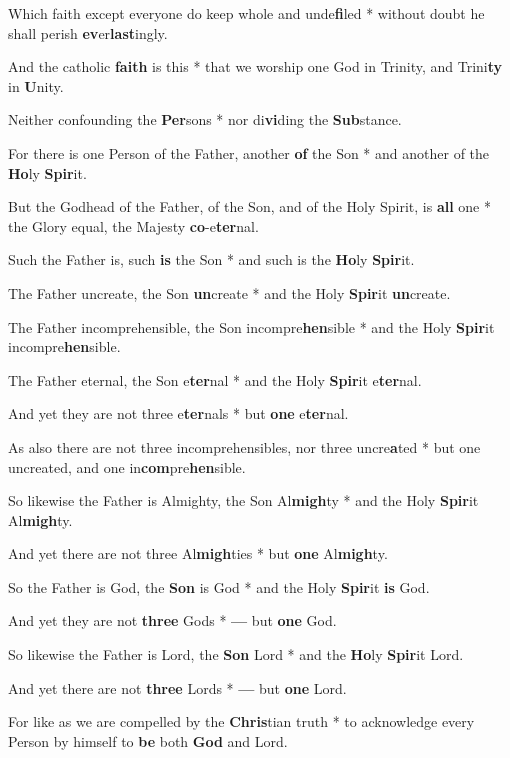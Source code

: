 \begin{multicols}{2}
	Which faith except everyone do keep whole and unde\textbf{fi}led * without doubt he shall perish \textbf{ev}er\textbf{last}ingly.
	
	And the catholic \textbf{faith} is this * that we worship one God in Trinity, and Trini\textbf{ty} in \textbf{U}nity.
	
	Neither confounding the \textbf{Per}sons * nor di\textbf{vi}ding the \textbf{Sub}stance.
	
	For there is one Person of the Father, another \textbf{of} the Son * and another of the \textbf{Ho}ly \textbf{Spir}it.
	
	But the Godhead of the Father, of the Son, and of the Holy Spirit, is \textbf{all} one * the Glory equal, the Majesty \textbf{co}-e\textbf{ter}nal.
	
	Such the Father is, such \textbf{is} the Son * and such is the \textbf{Ho}ly \textbf{Spir}it.
	
	The Father uncreate, the Son \textbf{un}create * and the Holy \textbf{Spir}it \textbf{un}create.
	
	The Father incomprehensible, the Son incompre\textbf{hen}sible * and the Holy \textbf{Spir}it incompre\textbf{hen}sible.
	
	The Father eternal, the Son e\textbf{ter}nal * and the Holy \textbf{Spir}it e\textbf{ter}nal.
	
	And yet they are not three e\textbf{ter}nals * but \textbf{one} e\textbf{ter}nal.
	
	As also there are not three incomprehensibles, nor three uncre\textbf{a}ted * but one uncreated, and one in\textbf{com}pre\textbf{hen}sible.
	
	So likewise the Father is Almighty, the Son Al\textbf{migh}ty * and the Holy \textbf{Spir}it Al\textbf{migh}ty.
	
	And yet there are not three Al\textbf{migh}ties * but \textbf{one} Al\textbf{migh}ty.
	
	So the Father is God, the \textbf{Son} is God * and the Holy \textbf{Spir}it \textbf{is} God.
	
	And yet they are not \textbf{three} Gods * \textbf{---} but \textbf{one} God.
	
	So likewise the Father is Lord, the \textbf{Son} Lord * and the \textbf{Ho}ly \textbf{Spir}it Lord.
	
	And yet there are not \textbf{three} Lords * \textbf{---} but \textbf{one} Lord.
	
	For like as we are compelled by the \textbf{Chris}tian truth * to acknowledge every Person by himself to \textbf{be} both \textbf{God} and Lord.
	

\end{multicols}
